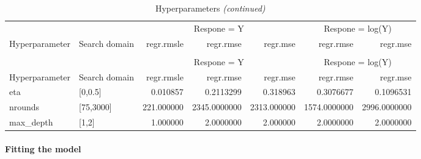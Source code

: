 \documentclass[
]{article}
\begin{document}
\begin{longtable}[t]{llrrrrr}
\caption{\label{tab:unnamed-chunk-20}Hyperparameters}\\
\toprule
\multicolumn{2}{c}{ } & \multicolumn{3}{c}{Respone = Y} & \multicolumn{2}{c}{Respone = log(Y)} \\
\cmidrule(l{3pt}r{3pt}){3-5} \cmidrule(l{3pt}r{3pt}){6-7}
Hyperparameter & Search domain & regr.rmsle & regr.rmse & regr.mse & regr.rmse & regr.mse\\
\midrule
\endfirsthead
\caption[]{Hyperparameters \textit{(continued)}}\\
\toprule
\multicolumn{2}{c}{ } & \multicolumn{3}{c}{Respone = Y} & \multicolumn{2}{c}{Respone = log(Y)} \\
\cmidrule(l{3pt}r{3pt}){3-5} \cmidrule(l{3pt}r{3pt}){6-7}
Hyperparameter & Search domain & regr.rmsle & regr.rmse & regr.mse & regr.rmse & regr.mse\\
\midrule
\endhead

\endfoot
\bottomrule
\endlastfoot
eta & {}[0,0.5] & 0.010857 & 0.2113299 & 0.318963 & 0.3076677 & 0.1096531\\
nrounds & {}[75,3000] & 221.000000 & 2345.0000000 & 2313.000000 & 1574.0000000 & 2996.0000000\\
max\_depth & {}[1,2] & 1.000000 & 2.0000000 & 2.000000 & 2.0000000 & 2.0000000\\*
\end{longtable}

\hypertarget{fitting-the-model}{%
\paragraph{Fitting the model}\label{fitting-the-model}}
\end{document}
